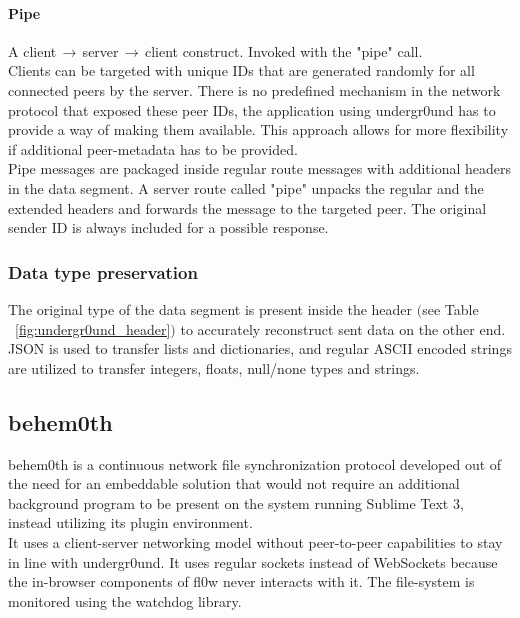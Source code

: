 \documentclass[conference,a4paper]{IEEEtran}
\begin{document}
\paragraph{Pipe}
A client$\,\to\,$server$\,\to\,$client construct. Invoked with the {\color{deepgreen}"pipe"} call. \\Clients can be targeted with unique IDs that are generated randomly for all connected peers by the server. There is no predefined mechanism in the network protocol that exposed these peer IDs, the application using undergr0und\cite{undergr0und:Philip Trauner} has to provide a way of making them available. This approach allows for more flexibility if additional peer-metadata has to be provided. \\Pipe messages are packaged inside regular route messages with additional headers in the data segment. A server route called {\color{deepgreen}"pipe"} unpacks the regular and the extended headers and forwards the message to the targeted peer. The original sender ID is always included for a possible response.\\

\subsubsection{Data type preservation}
The original type of the data segment is present inside the header $($see Table ~\ref{fig:undergr0und_header}$)$ to accurately reconstruct sent data on the other end. JSON\cite{JSON:T. Bray Ed.} is used to transfer lists and dictionaries, and regular ASCII encoded strings are utilized to transfer integers, floats, null/none types and strings. 

\subsection{behem0th}
behem0th\cite{behem0th:Christoph Heiss} is a continuous network file synchronization protocol developed out of the need for an embeddable solution that would not require an additional background program to be present on the system running Sublime Text 3\cite{Sublime Text 3:Sublime HQ}, instead utilizing its plugin environment. \\It uses a client-server networking model without peer-to-peer capabilities to stay in line with undergr0und. It uses regular sockets instead of WebSockets\cite{The WebSocket Protocol:A. Melnikov} because the in-browser components of fl0w\cite{fl0w:Philip Trauner} never interacts with it. The file-system is monitored using the watchdog\cite{watchdog:Yesudeep Mangalapilly} library.\\
\end{document}
